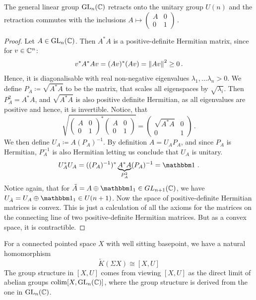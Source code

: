 \begin{lemma}\label{lemma:kTheo-generalGroupContractsToUnitary}
	The general linear group $\mathrm{GL}_n(\mathbb{C})$ retracts onto the unitary group $U(n)$ and the retraction commutes with the inclusions $A\mapsto \begin{pmatrix}
		A&0\\
		0&1
	\end{pmatrix}\,.$
\end{lemma}
\begin{proof}
	Let $A\in \mathrm{GL}_n(\mathbb{C})$. Then $A^*A$ is a positive-definite Hermitian matrix, since for $v \in \mathbb{C}^n$:
	\begin{equation*}
		v^*A^*Av=(Av)^*(Av)=\left\lVert Av\right\rVert^2\geq 0\,.
	\end{equation*}  Hence, it is diagonalisable with real non-negative eigenvalues $\lambda_1,\dots \lambda_n>0$. We define $P_A\coloneq \sqrt{A^*A}$ to be the matrix, that scales all eigenspaces by $\sqrt{\lambda_i}$. Then $P_A^2 =A^*A$, and $\sqrt{A^*A}$ is also positive definite Hermitian, as all eigenvalues are positive and hence, it is invertible. Notice, that 
	\begin{equation*}
		\sqrt{
		\begin{pmatrix}
			A&0\\0&1
		\end{pmatrix}^* 
				\begin{pmatrix}
			A&0\\0&1
		\end{pmatrix}
		}=
				\begin{pmatrix}
			\sqrt{A^*A}&0\\0&1
		\end{pmatrix}\,.
	\end{equation*}
	We then define $U_A\coloneq A  (P_A)^{-1}$. By definition $A=U_A P_A$, and since $P_A$ is Hermitian, $P_A^{-1}$ is also Hermitian letting us conclude that $U_A$ is unitary.
	\begin{equation*}
		U_A^*U_A=((P_A)^{-1})^*\underbrace{A^*A}_{P_A^2}  (P_A)^{-1}=\Idm\,.
	\end{equation*} Notice again, that for $\tilde{A}=A\oplus \Idm_1\in GL_{n+1}(\C)$, we have $U_{\tilde{A}}=U_A\oplus \Idm_1\in U(n+1)$. Now the space of positive-definite Hermitian matrices is convex. This is just a calculation of all the axioms for the matrices on the connecting line of two positive-definite Hermitian matrices. But as a convex space, it is contractible.
\end{proof}
\begin{lemma}\label{lem:kTheo-reducedSuspendedKGroupHomotopically}
	For a connected pointed space $X$ with well sitting basepoint, we have a natural homomorphism
	\begin{equation*}
		\tilde{K}(\Sigma X)\cong [X,U]
	\end{equation*} The group structure in $[X,U]$ comes from viewing $[X,U]$ as the direct limit of abelian groups $\operatorname{\mathrm{colim}}[X,\mathrm{GL}_n(\mathbb{C})]$, where the group structure is derived from the one in $\mathrm{GL}_n(\mathbb{C})$.
\end{lemma}

